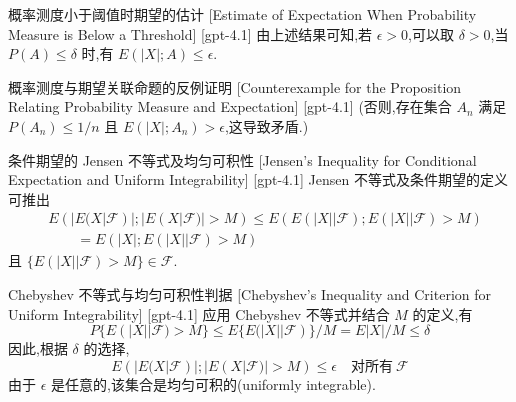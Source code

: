 \documentclass[UTF8]{ctexart}
\begin{document}
    \begin{crl}
        {概率测度小于阈值时期望的估计}
        [Estimate of Expectation When Probability Measure is Below a Threshold]
        [gpt-4.1]
        由上述结果可知,若 $\epsilon > 0$,可以取 $\delta > 0$,当 $P(A) \leq \delta$ 时,有 $E(|X|;A) \leq \epsilon$.
    \end{crl}
    
    
    
    \begin{cxmp}
        {概率测度与期望关联命题的反例证明}
        [Counterexample for the Proposition Relating Probability Measure and Expectation]
        [gpt-4.1]
        (否则,存在集合 $A_n$ 满足 $P(A_n) \leq 1/n$ 且 $E(|X|;A_n) > \epsilon$,这导致矛盾.)
    \end{cxmp}
    
    
    
    \begin{thm}
        {条件期望的 Jensen 不等式及均匀可积性}
        [Jensen's Inequality for Conditional Expectation and Uniform Integrability]
        [gpt-4.1]
        Jensen 不等式及条件期望的定义可推出
\[
\begin{array}{rl}
& E ( | E ( X | \mathcal{F} ) | ; | E ( X | \mathcal{F} ) | > M ) \leq E ( E ( | X | | \mathcal{F} ) ; E ( | X | | \mathcal{F} ) > M ) \\
& \qquad = E ( | X | ; E ( | X | | \mathcal{F} ) > M )
\end{array}
\]
且 $\{ E ( | X | | \mathcal{F} ) > M \} \in \mathcal{F}$.
    \end{thm}
    
    
    
    \begin{thm}
        {Chebyshev 不等式与均匀可积性判据}
        [Chebyshev's Inequality and Criterion for Uniform Integrability]
        [gpt-4.1]
        应用 Chebyshev 不等式并结合 $M$ 的定义,有
\[
P \{ E ( | X | | \mathcal{F} ) > M \} \leq E \{ E ( | X | | \mathcal{F} ) \} / M = E | X | / M \leq \delta
\]
因此,根据 $\delta$ 的选择,
\[
E ( | E ( X | {\mathcal{F}} ) | ; | E ( X | {\mathcal{F}} ) | > M ) \leq \epsilon \quad \text{对所有}~{\mathcal{F}}
\]
由于 $\epsilon$ 是任意的,该集合是均匀可积的(uniformly integrable).
    \end{thm}
    
\end{document}
